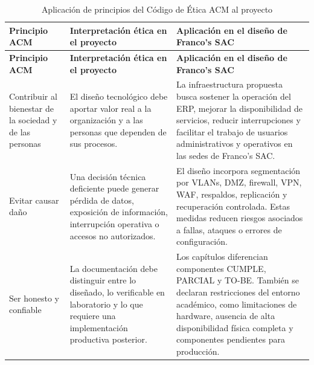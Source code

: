 \documentclass[11pt, a4paper, oneside]{report}
\begin{document}
\begin{xltabular}{\textwidth}{@{}|L{3.6cm}|X|X|@{}}
\caption{Aplicación de principios del Código de Ética ACM al proyecto}
\label{tab:aplicacion_codigo_etica_acm} \\

\parbox[c][1.1cm][c]{\linewidth}{\centering\color{white}\bfseries\small Principio ACM} &
\parbox[c][1.1cm][c]{\linewidth}{\centering\color{white}\bfseries\small Interpretación ética en el proyecto} &
\parbox[c][1.1cm][c]{\linewidth}{\centering\color{white}\bfseries\small Aplicación en el diseño de Franco's SAC} \\ \hline
\endfirsthead

\parbox[c][1.1cm][c]{\linewidth}{\centering\color{white}\bfseries\small Principio ACM} &
\parbox[c][1.1cm][c]{\linewidth}{\centering\color{white}\bfseries\small Interpretación ética en el proyecto} &
\parbox[c][1.1cm][c]{\linewidth}{\centering\color{white}\bfseries\small Aplicación en el diseño de Franco's SAC} \\ \hline
\endhead

\hline
\endfoot

{\small Contribuir al bienestar de la sociedad y de las personas} &
{\small El diseño tecnológico debe aportar valor real a la organización y a las personas que dependen de sus procesos.} &
{\small La infraestructura propuesta busca sostener la operación del ERP, mejorar la disponibilidad de servicios, reducir interrupciones y facilitar el trabajo de usuarios administrativos y operativos en las sedes de Franco's SAC.} \\ \hline

{\small Evitar causar daño} &
{\small Una decisión técnica deficiente puede generar pérdida de datos, exposición de información, interrupción operativa o accesos no autorizados.} &
{\small El diseño incorpora segmentación por VLANs, DMZ, firewall, VPN, WAF, respaldos, replicación y recuperación controlada. Estas medidas reducen riesgos asociados a fallas, ataques o errores de configuración.} \\ \hline

{\small Ser honesto y confiable} &
{\small La documentación debe distinguir entre lo diseñado, lo verificable en laboratorio y lo que requiere una implementación productiva posterior.} &
{\small Los capítulos diferencian componentes CUMPLE, PARCIAL y TO-BE. También se declaran restricciones del entorno académico, como limitaciones de hardware, ausencia de alta disponibilidad física completa y componentes pendientes para producción.} \\ \hline


\end{xltabular}
\end{document}
